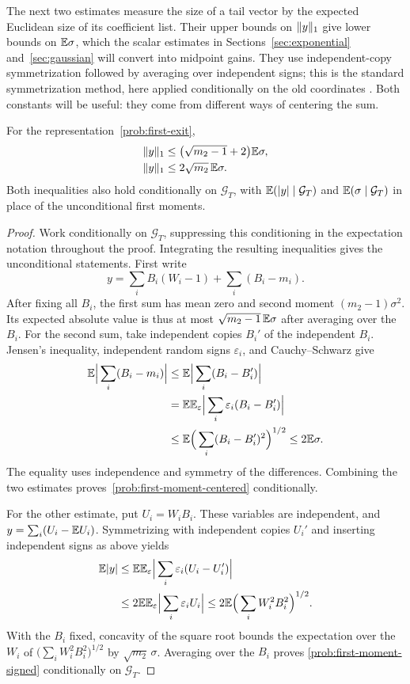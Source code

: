 The next two estimates measure the size of a tail vector by the expected
Euclidean size of its coefficient list. Their upper bounds on $\lVert y\rVert_1$
give lower bounds on $\mathbb E\sigma$, which the scalar estimates in
Sections~\ref{sec:exponential} and~\ref{sec:gaussian} will convert into
midpoint gains. They use independent-copy
symmetrization followed by averaging over independent signs; this is the
standard symmetrization method, here applied conditionally on the old
coordinates \cite[proof of Theorem~8, p.~468]{BartlettMendelson2002}.
Both constants will be useful: they come from different ways of centering
the sum.
\begin{lemma}\label{prob:first-moment}
For the representation~\eqref{prob:first-exit},
\begin{align}
 \lVert y\rVert_1&\le\bigl(\sqrt{m_2-1}+2\bigr)\mathbb E\sigma,
 \label{prob:first-moment-centered}\\
 \lVert y\rVert_1&\le2\sqrt{m_2}\,\mathbb E\sigma.
 \label{prob:first-moment-signed}
\end{align}
Both inequalities also hold conditionally on $\mathcal G_T$, with
$\mathbb E(|y|\mid\mathcal G_T)$ and $\mathbb E(\sigma\mid\mathcal G_T)$ in place
of the unconditional first moments.
\end{lemma}
\begin{proof}
Work conditionally on $\mathcal G_T$, suppressing this conditioning in the
expectation notation throughout the proof. Integrating the resulting
inequalities gives the unconditional statements.
First write
\[
 y=\sum_iB_i(W_i-1)+\sum_i(B_i-m_i).
\]
After fixing all $B_i$, the first sum has mean zero
and second moment $(m_2-1)\sigma^2$.  Its expected absolute value is thus
at most $\sqrt{m_2-1}\,\mathbb E\sigma$ after averaging over the $B_i$.
For the second sum, take independent copies $B_i'$ of the independent
$B_i$. Jensen's inequality,
independent random signs $\varepsilon_i$, and Cauchy--Schwarz give
\begin{align*}
 \mathbb E\Big|\sum_i(B_i-m_i)\Big|
 &\le\mathbb E\Big|\sum_i(B_i-B_i')\Big|\\
 &=\mathbb E\mathbb E_{\varepsilon}\Big|\sum_i\varepsilon_i(B_i-B_i')\Big|\\
 &\le\mathbb E\Big(\sum_i(B_i-B_i')^2\Big)^{1/2}
 \le2\mathbb E\sigma.
\end{align*}
The equality uses independence and symmetry of the differences. Combining
the two estimates proves~\eqref{prob:first-moment-centered} conditionally.

For the other estimate, put
$U_i=W_iB_i$.  These variables are independent, and $y=\sum_i(U_i-\mathbb E U_i)$.
Symmetrizing with independent copies $U_i'$ and inserting independent signs
as above yields
\begin{align*}
 \mathbb E|y|
 &\le\mathbb E\mathbb E_{\varepsilon}\Big|\sum_i\varepsilon_i(U_i-U_i')\Big|\\
 &\le2\mathbb E\mathbb E_{\varepsilon}\Big|\sum_i\varepsilon_iU_i\Big|
 \le2\mathbb E\Big(\sum_iW_i^2B_i^2\Big)^{1/2}.
\end{align*}
With the $B_i$ fixed, concavity of the square root bounds the expectation
over the $W_i$ of $\bigl(\sum_iW_i^2B_i^2\bigr)^{1/2}$ by
$\sqrt{m_2}\,\sigma$. Averaging over the $B_i$ proves
\eqref{prob:first-moment-signed} conditionally on $\mathcal G_T$.
\end{proof}

